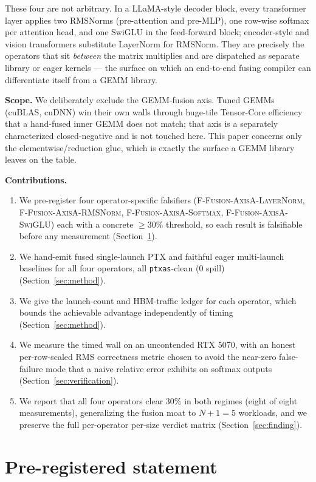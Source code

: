 \documentclass[11pt,a4paper]{article}
\newcommand{\fln}{\textsc{F-Fusion-AxisA-LayerNorm}}
\newcommand{\frms}{\textsc{F-Fusion-AxisA-RMSNorm}}
\newcommand{\fsm}{\textsc{F-Fusion-AxisA-Softmax}}
\newcommand{\fswi}{\textsc{F-Fusion-AxisA-SwiGLU}}
\begin{document}
These four are not arbitrary. In a LLaMA-style decoder block, every transformer
layer applies two RMSNorms (pre-attention and pre-MLP), one row-wise softmax per
attention head, and one SwiGLU in the feed-forward block; encoder-style and
vision transformers substitute LayerNorm for RMSNorm. They are precisely the
operators that sit \emph{between} the matrix multiplies and are dispatched as
separate library or eager kernels --- the surface on which an end-to-end fusing
compiler can differentiate itself from a GEMM library.

\medskip
\noindent\textbf{Scope.} We deliberately exclude the GEMM-fusion axis. Tuned
GEMMs (cuBLAS, cuDNN) win their own walls through huge-tile Tensor-Core
efficiency that a hand-fused inner GEMM does not match; that axis is a
separately characterized closed-negative and is not touched here. This paper
concerns only the elementwise/reduction glue, which is exactly the surface a
GEMM library leaves on the table.

\medskip
\noindent\textbf{Contributions.}
\begin{enumerate}\itemsep0.3em
\item We pre-register four operator-specific falsifiers (\fln, \frms, \fsm,
  \fswi) each with a concrete $\ge 30\%$ threshold, so each result is
  falsifiable before any measurement (Section~\ref{sec:statement}).
\item We hand-emit fused single-launch PTX and faithful eager multi-launch
  baselines for all four operators, all \texttt{ptxas}-clean ($0$ spill)
  (Section~\ref{sec:method}).
\item We give the launch-count and HBM-traffic ledger for each operator, which
  bounds the achievable advantage independently of timing
  (Section~\ref{sec:method}).
\item We measure the timed wall on an uncontended RTX 5070, with an honest
  per-row-scaled RMS correctness metric chosen to avoid the near-zero
  false-failure mode that a naive relative error exhibits on softmax outputs
  (Section~\ref{sec:verification}).
\item We report that all four operators clear $30\%$ in both regimes (eight of
  eight measurements), generalizing the fusion moat to $N+1=5$ workloads, and we
  preserve the full per-operator per-size verdict matrix
  (Section~\ref{sec:finding}).
\end{enumerate}

\section{Pre-registered statement}
\label{sec:statement}
\end{document}
